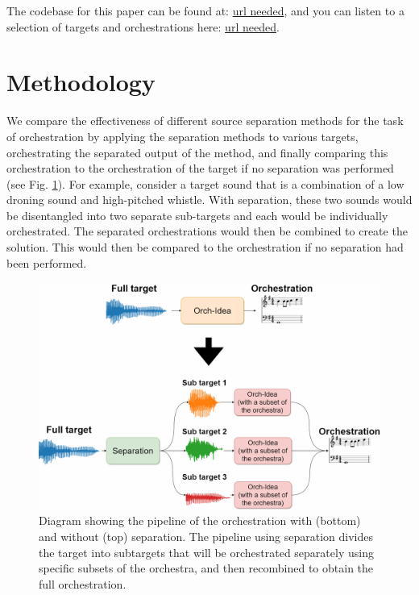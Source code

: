 \documentclass{article}
\begin{document}
	The codebase for this paper can be found at: \url{url needed}, and you can listen to a selection of targets and orchestrations here: \url{url needed}.
		
	
	\section{Methodology}\label{sec:methodology}
	
	We compare the effectiveness of different source separation methods for the task of orchestration by applying the separation methods to various targets, orchestrating the separated output of the method, and finally comparing this orchestration to the orchestration of the target if no separation was performed (see Fig. \ref{fig:full_diagram}). For example, consider a target sound that is a combination of a low droning sound and high-pitched whistle. With separation, these two sounds would be disentangled into two separate sub-targets and each would be individually orchestrated. The separated orchestrations would then be combined to create the solution. This would then be compared to the orchestration if no separation had been performed.
	
	\begin{figure}[t]
		\centering
			\includegraphics[width=\columnwidth]{figures/diagram.png}
			\caption{Diagram showing the pipeline of the orchestration with (bottom) and without (top) separation. The pipeline using separation divides the target into subtargets that will be orchestrated separately using specific subsets of the orchestra, and then recombined to obtain the full orchestration.}\label{fig:full_diagram}
	\end{figure}
	
\end{document}
